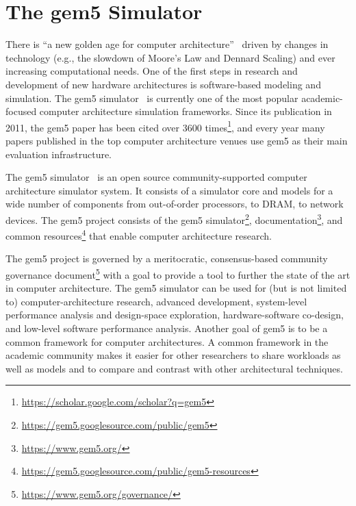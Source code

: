\section{The gem5 Simulator}


There is ``a new golden age for computer architecture''~\cite{HennessyPatterson-turingLect-isca18, HennessyPatterson-CACM19} driven by changes in technology (e.g., the slowdown of Moore's Law and Dennard Scaling) and ever increasing computational needs.
One of the first steps in research and development of new hardware architectures is software-based modeling and simulation.
The gem5 simulator~\cite{Binkert-gem5-2011} is currently one of the most popular academic-focused computer architecture simulation frameworks.
Since its publication in 2011, the gem5 paper has been cited over 3600 times\footnote{\url{https://scholar.google.com/scholar?q=gem5}}, and every year many papers published in the top computer architecture venues use gem5 as their main evaluation infrastructure.

The gem5 simulator~\cite{Binkert-gem5-2011} is an open source community-supported computer architecture simulator system.
It consists of a simulator core and models for a wide number of components from out-of-order processors, to DRAM, to network devices.
The gem5 project consists of the gem5 simulator\footnote{\url{https://gem5.googlesource.com/public/gem5}}, documentation\footnote{\url{https://www.gem5.org/}}, and common resources\footnote{\url{https://gem5.googlesource.com/public/gem5-resources}} that enable computer architecture research.

The gem5 project is governed by a meritocratic, consensus-based community governance document\footnote{\url{https://www.gem5.org/governance/}} with a goal to provide a tool to further the state of the art in computer architecture.
The gem5 simulator can be used for (but is not limited to) computer-architecture research, advanced development, system-level performance analysis and design-space exploration, hardware-software co-design, and low-level software performance analysis.
Another goal of gem5 is to be a common framework for computer architectures.
A common framework in the academic community makes it easier for other researchers to share workloads as well as models and to compare and contrast with other architectural techniques.


